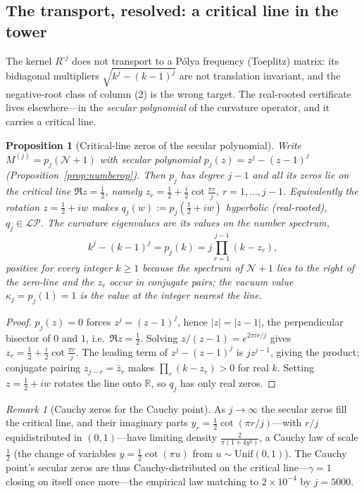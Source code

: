 \documentclass[11pt,reqno]{amsart}
\theoremstyle{plain}
\newtheorem{proposition}[theorem]{Proposition}
\theoremstyle{definition}
\theoremstyle{remark}
\newtheorem{remark}[theorem]{Remark}
\newcommand{\R}{\mathbb R}
\newcommand{\LP}{\mathcal{LP}}
\newcommand{\Had}{\circ}
\begin{document}
\subsection{The transport, resolved: a critical line in the tower}
\label{sec:transport}
The kernel $R^{\Had j}$ does not transport to a P\'olya frequency
(Toeplitz) matrix: its bidiagonal multipliers $\sqrt{k^j-(k-1)^j}$ are not
translation invariant, and the negative-root class of column (2) is the
wrong target. The real-rooted certificate lives elsewhere---in the
\emph{secular polynomial} of the curvature operator, and it carries a
critical line.

\begin{proposition}[Critical-line zeros of the secular polynomial]
\label{prop:critline}
Write $M^{(j)}=p_j(\mathcal N+1)$ with secular polynomial
$p_j(z)=z^j-(z-1)^j$ (Proposition~\ref{prop:numberop}). Then $p_j$ has
degree $j-1$ and \emph{all its zeros lie on the critical line}
$\Re z=\tfrac12$, namely $z_r=\tfrac12+\tfrac{i}{2}\cot\frac{\pi r}{j}$,
$r=1,\dots,j-1$. Equivalently the rotation $z=\tfrac12+iw$ makes
$q_j(w):=p_j(\tfrac12+iw)$ hyperbolic (real-rooted), $q_j\in\LP$. The
curvature eigenvalues are its values on the number spectrum,
\[
   k^j-(k-1)^j=p_j(k)=j\prod_{r=1}^{j-1}(k-z_r),
\]
positive for every integer $k\ge1$ because the spectrum of $\mathcal N+1$
lies to the right of the zero-line and the $z_r$ occur in conjugate pairs;
the vacuum value $\kappa_j=p_j(1)=1$ is the value at the integer nearest
the line.
\end{proposition}

\begin{proof}
$p_j(z)=0$ forces $z^j=(z-1)^j$, hence $|z|=|z-1|$, the perpendicular
bisector of $0$ and $1$, i.e.\ $\Re z=\tfrac12$. Solving
$z/(z-1)=e^{2\pi i r/j}$ gives $z_r=\tfrac12+\tfrac{i}{2}\cot\frac{\pi
r}{j}$. The leading term of $z^j-(z-1)^j$ is $jz^{j-1}$, giving the
product; conjugate pairing $z_{j-r}=\bar z_r$ makes
$\prod_r(k-z_r)>0$ for real $k$. Setting $z=\tfrac12+iw$ rotates the line
onto $\R$, so $q_j$ has only real zeros.
\end{proof}

\begin{remark}[Cauchy zeros for the Cauchy point]\label{rem:cauchyzeros}
As $j\to\infty$ the secular zeros fill the critical line, and their
imaginary parts $y_r=\tfrac12\cot(\pi r/j)$---with $r/j$ equidistributed in
$(0,1)$---have limiting density $\tfrac{2}{\pi(1+4y^2)}$, a Cauchy law of
scale $\tfrac12$ (the change of variables $y=\tfrac12\cot(\pi u)$ from
$u\sim\mathrm{Unif}(0,1)$). The Cauchy point's secular zeros are thus
Cauchy-distributed on the critical line---$\gamma=1$ closing on itself once
more---the empirical law matching to $2\times10^{-4}$ by $j=5000$.
\end{remark}
\end{document}

